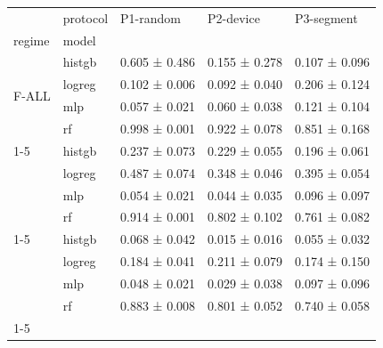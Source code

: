 \begin{tabular}{lllll}
\toprule
 & protocol & P1-random & P2-device & P3-segment \\
regime & model &  &  &  \\
\midrule
\multirow[t]{4}{*}{F-ALL} & histgb & 0.605 ± 0.486 & 0.155 ± 0.278 & 0.107 ± 0.096 \\
 & logreg & 0.102 ± 0.006 & 0.092 ± 0.040 & 0.206 ± 0.124 \\
 & mlp & 0.057 ± 0.021 & 0.060 ± 0.038 & 0.121 ± 0.104 \\
 & rf & 0.998 ± 0.001 & 0.922 ± 0.078 & 0.851 ± 0.168 \\
\cline{1-5}
\multirow[t]{4}{*}{F-BEHAV} & histgb & 0.237 ± 0.073 & 0.229 ± 0.055 & 0.196 ± 0.061 \\
 & logreg & 0.487 ± 0.074 & 0.348 ± 0.046 & 0.395 ± 0.054 \\
 & mlp & 0.054 ± 0.021 & 0.044 ± 0.035 & 0.096 ± 0.097 \\
 & rf & 0.914 ± 0.001 & 0.802 ± 0.102 & 0.761 ± 0.082 \\
\cline{1-5}
\multirow[t]{4}{*}{F-NOID} & histgb & 0.068 ± 0.042 & 0.015 ± 0.016 & 0.055 ± 0.032 \\
 & logreg & 0.184 ± 0.041 & 0.211 ± 0.079 & 0.174 ± 0.150 \\
 & mlp & 0.048 ± 0.021 & 0.029 ± 0.038 & 0.097 ± 0.096 \\
 & rf & 0.883 ± 0.008 & 0.801 ± 0.052 & 0.740 ± 0.058 \\
\cline{1-5}
\bottomrule
\end{tabular}
